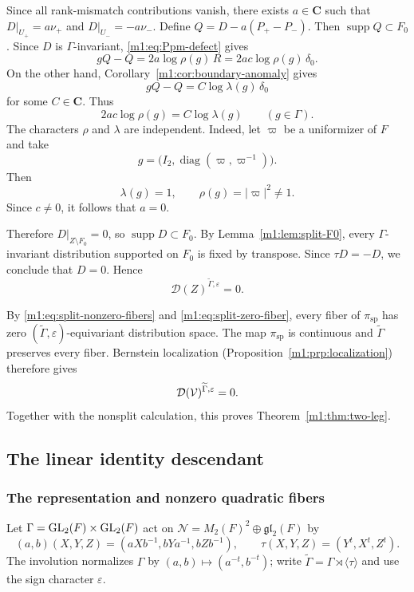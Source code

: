 Since all rank-mismatch contributions vanish, there exists
$a\in\mathbf C$ such that \(D|_{U_+}=a\nu_+\) and \(D|_{U_-}=-a\nu_-\). Define
\(Q=D-a(P_+-P_-)\). Then \(\operatorname{supp}Q\subset F_0\). Since $D$ is $\Gamma$-invariant,
\eqref{m1:eq:Ppm-defect} gives
\begin{equation}\label{m1:eq:Q-rho-defect}
    gQ-Q=2a\log\rho(g)\,R
    =2ac\log\rho(g)\,\delta_0.
\end{equation}
On the other hand, Corollary~\ref{m1:cor:boundary-anomaly} gives
\[
    gQ-Q=C\log\lambda(g)\,\delta_0
\]
for some $C\in\mathbf C$.  Thus
\[
    2ac\log\rho(g)=C\log\lambda(g)
    \qquad(g\in \Gamma).
\]
The characters $\rho$ and $\lambda$ are independent.  Indeed, let $\varpi$
be a uniformizer of $F$ and take
\[
    g=\bigl(I_2,\operatorname{diag}(\varpi,\varpi^{-1})\bigr).
\]
Then
\[
    \lambda(g)=1,
    \qquad
    \rho(g)=|\varpi|^2\neq1.
\]
Since $c\neq0$, it follows that $a=0$.

Therefore $D|_{Z\setminus F_0}=0$, so $\operatorname{supp}D\subset F_0$.
By Lemma~\ref{m1:lem:split-F0}, every $\Gamma$-invariant distribution supported on
$F_0$ is fixed by transpose.  Since $\tau D=-D$, we conclude that $D=0$.
Hence
\begin{equation}\label{m1:eq:split-zero-fiber}
    \mathcal D(Z)^{\widetilde \Gamma,\varepsilon}=0.
\end{equation}

By \eqref{m1:eq:split-nonzero-fibers} and \eqref{m1:eq:split-zero-fiber}, every
fiber of $\pi_{\mathrm{sp}}$ has zero $(\widetilde \Gamma,\varepsilon)$-equivariant
distribution space.  The map $\pi_{\mathrm{sp}}$ is continuous and
$\widetilde \Gamma$ preserves every fiber.  Bernstein localization
(Proposition~\ref{m1:prp:localization}) therefore gives
\[
    \mathcal D(\mathcal V)^{\widetilde \Gamma,\varepsilon}=0.
\]
Together with the nonsplit calculation, this proves
Theorem~\ref{m1:thm:two-leg}.

\subsection{The linear identity descendant}\label{m1:sec:identity}
\subsubsection{The representation and nonzero quadratic fibers}
\label{m1:subsec:identity-fibers}
Let $\Gamma=\operatorname{GL}_2(F)\times\operatorname{GL}_2(F)$ act on
$\mathcal N=M_2(F)^2\oplus\mathfrak{gl}_2(F)$ by
\begin{equation}\label{m1:eq:identity-action}
 (a,b)(X,Y,Z)=(aXb^{-1},bYa^{-1},bZb^{-1}),\qquad
 \tau(X,Y,Z)=(Y^t,X^t,Z^t).
\end{equation}
The involution normalizes $\Gamma$ by $(a,b)\mapsto(a^{-t},b^{-t})$;
write $\widetilde\Gamma=\Gamma\rtimes\langle\tau\rangle$ and use the
sign character $\varepsilon$.

